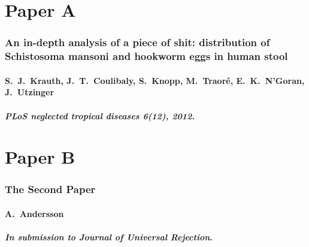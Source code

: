 
\chapter{Paper A}
\label{chap_paper_a}
\thispagestyle{empty}
\subsection*{An in-depth analysis of a piece of shit: distribution of Schistosoma mansoni and hookworm eggs in human stool}
\subsubsection*{S.~J.~Krauth, J.~T.~Coulibaly, S.~Knopp, M.~Traor{\'e}, E.~K.~N'Goran, J.~Utzinger}
\subsubsection*{{\em PLoS neglected tropical diseases 6(12), 2012}.}
\newpage
\thispagestyle{empty}
\mbox{}
\newpage
\addtocounter{page}{-2}




\chapter{Paper B}
\label{chap_paper_b}
\thispagestyle{empty}
\subsection*{The Second Paper}
\subsubsection*{A.~Andersson}
\subsubsection*{{\em In submission to Journal of Universal Rejection}.}
\newpage
\thispagestyle{empty}
\mbox{}
\newpage
\addtocounter{page}{-2}


